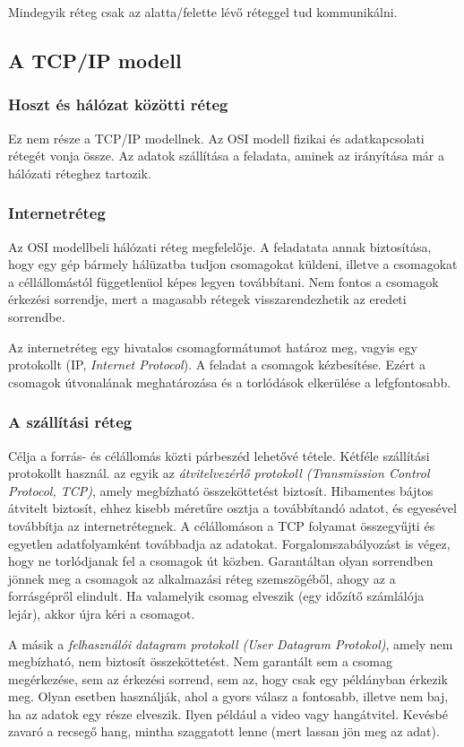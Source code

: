 \documentclass[fleqn,10pt,a4paper]{article}
\theoremstyle{magyar}
\begin{document}
  Mindegyik réteg csak az alatta/felette lévő réteggel tud kommunikálni.

  \subsection{A TCP/IP modell}
  \subsubsection{Hoszt és hálózat közötti réteg}
  Ez nem része a TCP/IP modellnek. Az OSI modell fizikai és adatkapcsolati rétegét vonja össze. Az adatok szállítása a
  feladata, aminek az irányítása már a hálózati réteghez tartozik.

  \subsubsection{Internetréteg}
  Az OSI modellbeli  hálózati réteg megfelelője. A feladatata annak biztosítása, hogy egy gép bármely hálüzatba tudjon
  csomagokat küldeni, illetve a csomagokat a céllállomástól függetlenüol képes legyen továbbítani. Nem fontos a csomagok
  érkezési sorrendje, mert a magasabb rétegek visszarendezhetik az eredeti sorrendbe.
  
  Az internetréteg egy hivatalos csomagformátumot határoz meg, vagyis egy protokollt (IP, \emph{Internet Protocol}). A
  feladat a csomagok kézbesítése. Ezért a csomagok útvonalának meghatározása és a torlódások elkerülése a
  lefgfontosabb.

  \subsubsection{A szállítási réteg}
  Célja a forrás- és célállomás közti párbeszéd lehetővé tétele. Kétféle szállítási protokollt használ. az egyik az
  \emph{átvitelvezérlő protokoll (Transmission Control Protocol, TCP)}, amely megbízható összeköttetést
  biztosít. Hibamentes bájtos átvitelt biztosít, ehhez kisebb méretűre osztja a továbbítandó adatot, és egyesével
  továbbítja az internetrétegnek. A célállomáson a TCP folyamat összegyűjti és egyetlen adatfolyamként továbbadja az
  adatokat. Forgalomszabályozást is végez, hogy ne torlódjanak fel a csomagok út közben. Garantáltan olyan sorrendben
  jönnek meg a csomagok az alkalmazási réteg szemszögéből, ahogy az a forrásgépről elindult. Ha valamelyik csomag
  elveszik (egy időzítő számlálója lejár), akkor újra kéri a csomagot.

  A másik a \emph{felhasználói datagram protokoll (User Datagram Protokol)}, amely nem megbízható, nem biztosít
  összeköttetést. Nem garantált sem a csomag megérkezése, sem az érkezési sorrend, sem az, hogy csak egy példányban
  érkezik meg. Olyan esetben használják, ahol a gyors válasz a fontosabb, illetve nem baj, ha az adatok egy része
  elveszik. Ilyen például a video vagy hangátvitel. Kevésbé zavaró a recsegő hang, mintha szaggatott lenne (mert lassan
  jön meg az adat).
\end{document}
